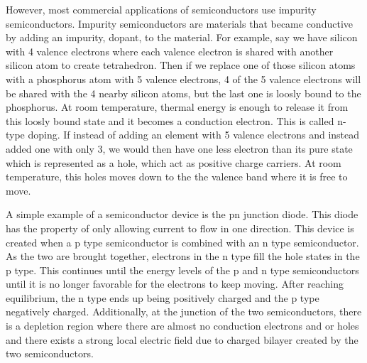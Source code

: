 \documentclass[ aip, 12pt]{revtex4-1} %
\begin{document}
However, most commercial applications of semiconductors use impurity semiconductors. Impurity semiconductors are materials that became conductive by adding an impurity, dopant, to the material. For example, say we have silicon with 4 valence electrons where each valence electron is shared with another silicon atom to create tetrahedron. Then if we replace one of those silicon atoms with a phosphorus atom with 5 valence electrons, 4 of the 5 valence electrons will be shared with the 4 nearby silicon atoms, but the last one is loosly bound to the phosphorus. At room temperature, thermal energy is enough to release it from this loosly bound state and it becomes a conduction electron. This is called n-type doping. If instead of adding an element with 5 valence electrons and instead added one with only 3, we would then have one less electron than its pure state which is represented as a hole, which act as positive charge carriers. At room temperature, this holes moves down to the the valence band where it is free to move.

A simple example of a semiconductor device is the pn junction diode. This diode has the property of only allowing current to flow in one direction. This device is created when a p type semiconductor is combined with an n type semiconductor. As the two are brought together, electrons in the n type fill the hole states  in the p type. This continues until the energy levels of the p and n type semiconductors until it is no longer favorable for the electrons to keep moving. After reaching equilibrium, the n type ends up being positively charged and the p type negatively charged. Additionally, at the junction of the two semiconductors, there is a depletion region where there are almost no conduction electrons and or holes and there exists a strong local electric field due to charged bilayer created by the two semiconductors. 
\end{document}

